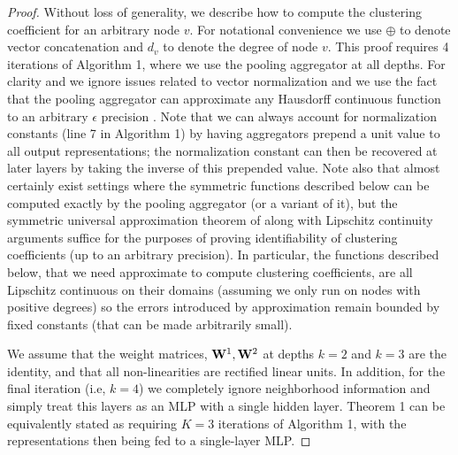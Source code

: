 \begin{proof}
Without loss of generality, we describe how to compute the clustering coefficient for an arbitrary node $v$.
For notational convenience we use $\oplus$ to denote vector concatenation and $d_v$ to denote the degree of node $v$.
This proof requires 4 iterations of Algorithm 1, where we use the pooling aggregator at all depths. 
For clarity and we ignore issues related to vector normalization and we use the fact that the pooling aggregator can approximate any Hausdorff continuous function to an arbitrary $\epsilon$ precision \cite{qi2016pointnet}.
Note that we can always account for normalization constants (line 7 in Algorithm 1) by having aggregators prepend a unit value to all output representations; the normalization constant can then be recovered at later layers by taking the inverse of this prepended value. 
Note also that almost certainly exist settings where the symmetric functions described below can be computed exactly by the pooling aggregator (or a variant of it), but the symmetric universal approximation theorem of \cite{qi2016pointnet} along with Lipschitz continuity arguments suffice for the purposes of proving identifiability of clustering coefficients (up to an arbitrary precision).
In particular, the functions described below, that we need approximate to compute clustering coefficients, are all Lipschitz continuous on their domains (assuming we only run on nodes with positive degrees) so the errors introduced by approximation remain bounded by fixed constants (that can be made arbitrarily small). 

We assume that the weight matrices, $\mathbf{W}^1, \mathbf{W}^2$ at depths $k=2$ and $k=3$ are the identity, and that all non-linearities are rectified linear units. 
In addition, for the final iteration (i.e, $k=4$) we completely ignore neighborhood information and simply treat this layers as an MLP with a single hidden layer.
Theorem 1 can be equivalently stated as requiring $K=3$ iterations of Algorithm 1, with the representations then being fed to a single-layer MLP. 


\end{proof}
